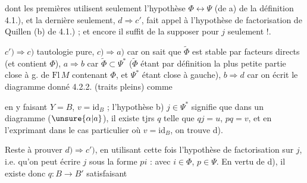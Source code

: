 
dont les  premières utilisent seulement
l'hypothèse $\Phi\longleftrightarrow\Psi$ (de a) de la définition
4.1.), et la dernière seulement, $d\Rightarrow c'$, fait appel
à l'hypothèse de factorisation de Quillen (b) de
4.1.) ; et encore il suffit de la supposer pour $j$ seulement !.

$c')\Rightarrow c)$ tautologie pure, $c)\Rightarrow a)$ car on sait
que $\widetilde\Phi$ est stable par facteurs directs (et contient $\Phi$),
$a\Rightarrow b$ car $\widetilde\Phi\subset\Psi^*$ ($\widetilde\Phi$ étant par définition la plus
petite partie close à g. de $\mathrm{Fl}\,M$ contenant $\Phi$,
et $\Psi^*$ étant close à gauche), $b\Rightarrow d$ car on écrit
le diagramme donné 4.2.2. (traits pleins)
comme

en y faisant  $Y=B$, $v=\mathrm{id}_B$  ;
l'hypothèse b) $j\in\Psi^*$ signifie que dans un diagramme  ($\unsure{\alpha|a}$), il
existe tjrs $q$ telle que $qj=u$, $pq=v$,
et en l'exprimant dans le cas particulier
où $v=\mathrm{id}_B$, on trouve d).

Reste à prouver $d)\Rightarrow c')$, en utilisant
cette fois l'hypothèse de factorisation sur $j$, i.e.
qu'on peut écrire $j$ sous la forme $pi$ :
avec $i\in\Phi$, $p\in\Psi$. En vertu de
d),  il existe donc $q:B\longrightarrow B'$ satisfaisant
